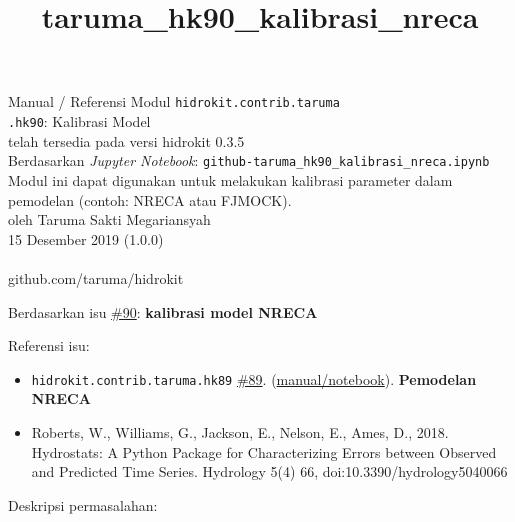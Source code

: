 \documentclass[11pt]{article}
\title{taruma\_hk90\_kalibrasi\_nreca}
\providecommand{\tightlist}{%
      \setlength{\itemsep}{0pt}\setlength{\parskip}{0pt}}
\begin{document}
  
	\begin{titlepage}
		\vspace*{\fill}
		\begin{center}
 		\normalsize Manual / Referensi Modul \texttt{hidrokit.contrib.taruma}\\
		\huge \texttt{.hk90}: Kalibrasi Model\\ 
		\small telah tersedia pada versi hidrokit 0.3.5 \\[0.2cm]
      	\small Berdasarkan \emph{Jupyter Notebook}: \texttt{github-taruma\_hk90\_kalibrasi\_nreca.ipynb} \\[0.5cm]
      	\small Modul ini dapat digunakan untuk melakukan kalibrasi parameter dalam pemodelan (contoh: NRECA atau FJMOCK). \\[0.5cm]
		\normalsize oleh Taruma Sakti Megariansyah\\[0.5cm]
      	\normalsize 15 Desember 2019 (1.0.0)\\[1cm]
    	\\
      	\normalsize github.com/taruma/hidrokit
		\end{center}
    	\vspace*{\fill}
	\end{titlepage}
    
    

    
    

    Berdasarkan isu
\href{https://github.com/taruma/hidrokit/issues/90}{\#90}:
\textbf{kalibrasi model NRECA}

Referensi isu:

\begin{itemize}
\tightlist
\item
  \texttt{hidrokit.contrib.taruma.hk89}
  \href{https://github.com/taruma/hidrokit/issues/89}{\#89}.
  (\href{https://gist.github.com/taruma/1502a7aa67cf074969d806cd3ffdf35c}{manual/notebook}).
  \textbf{Pemodelan NRECA}
\item
  Roberts, W., Williams, G., Jackson, E., Nelson, E., Ames, D., 2018.
  Hydrostats: A Python Package for Characterizing Errors between
  Observed and Predicted Time Series. Hydrology 5(4) 66,
  doi:10.3390/hydrology5040066
\end{itemize}

Deskripsi permasalahan:
\end{document}
